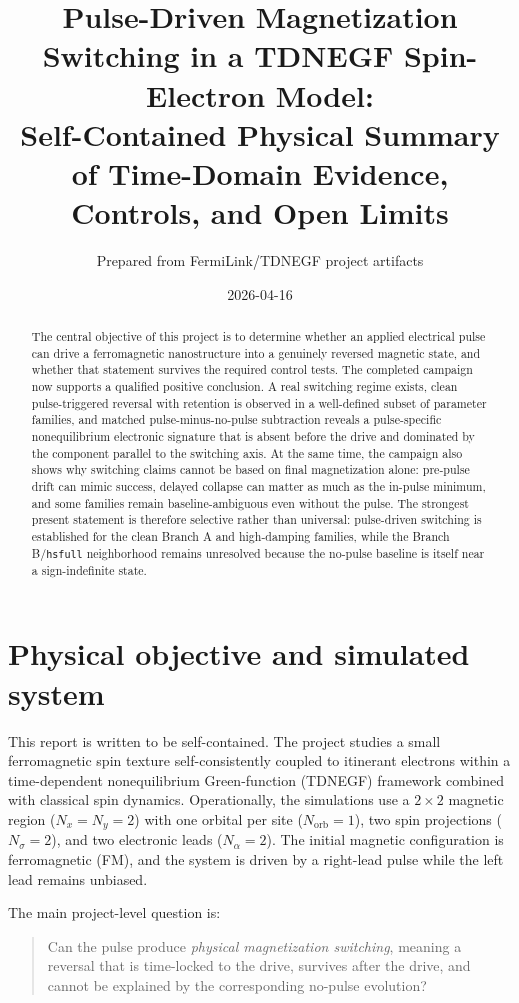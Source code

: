 \documentclass[11pt]{article}
\title{Pulse-Driven Magnetization Switching in a TDNEGF Spin-Electron Model:\\Self-Contained Physical Summary of Time-Domain Evidence, Controls, and Open Limits}
\author{Prepared from FermiLink/TDNEGF project artifacts}
\date{2026-04-16}
\begin{document}
\maketitle

\begin{abstract}
The central objective of this project is to determine whether an applied electrical pulse can drive a ferromagnetic nanostructure into a genuinely reversed magnetic state, and whether that statement survives the required control tests. The completed campaign now supports a qualified positive conclusion. A real switching regime exists, clean pulse-triggered reversal with retention is observed in a well-defined subset of parameter families, and matched pulse-minus-no-pulse subtraction reveals a pulse-specific nonequilibrium electronic signature that is absent before the drive and dominated by the component parallel to the switching axis. At the same time, the campaign also shows why switching claims cannot be based on final magnetization alone: pre-pulse drift can mimic success, delayed collapse can matter as much as the in-pulse minimum, and some families remain baseline-ambiguous even without the pulse. The strongest present statement is therefore selective rather than universal: pulse-driven switching is established for the clean Branch A and high-damping families, while the Branch B/\texttt{hsfull} neighborhood remains unresolved because the no-pulse baseline is itself near a sign-indefinite state.
\end{abstract}

\section{Physical objective and simulated system}
This report is written to be self-contained. The project studies a small ferromagnetic spin texture self-consistently coupled to itinerant electrons within a time-dependent nonequilibrium Green-function (TDNEGF) framework combined with classical spin dynamics. Operationally, the simulations use a \(2\times 2\) magnetic region (\(N_x=N_y=2\)) with one orbital per site (\(N_{\mathrm{orb}}=1\)), two spin projections (\(N_\sigma=2\)), and two electronic leads (\(N_\alpha=2\)). The initial magnetic configuration is ferromagnetic (FM), and the system is driven by a right-lead pulse while the left lead remains unbiased.

The main project-level question is:
\begin{quote}
Can the pulse produce \emph{physical magnetization switching}, meaning a reversal that is time-locked to the drive, survives after the drive, and cannot be explained by the corresponding no-pulse evolution?
\end{quote}
\end{document}
